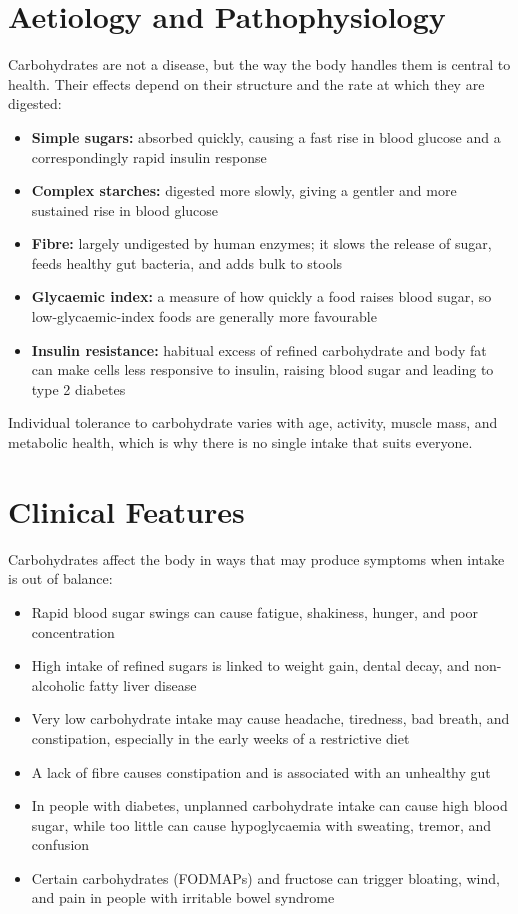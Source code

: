 \section*{Aetiology and Pathophysiology}
Carbohydrates are not a disease, but the way the body handles them is central to health. Their effects depend on their structure and the rate at which they are digested:
\begin{itemize}
    \item \textbf{Simple sugars:} absorbed quickly, causing a fast rise in blood glucose and a correspondingly rapid insulin response
    \item \textbf{Complex starches:} digested more slowly, giving a gentler and more sustained rise in blood glucose
    \item \textbf{Fibre:} largely undigested by human enzymes; it slows the release of sugar, feeds healthy gut bacteria, and adds bulk to stools
    \item \textbf{Glycaemic index:} a measure of how quickly a food raises blood sugar, so low-glycaemic-index foods are generally more favourable
    \item \textbf{Insulin resistance:} habitual excess of refined carbohydrate and body fat can make cells less responsive to insulin, raising blood sugar and leading to type 2 diabetes
\end{itemize}
Individual tolerance to carbohydrate varies with age, activity, muscle mass, and metabolic health, which is why there is no single intake that suits everyone.

\section*{Clinical Features}
Carbohydrates affect the body in ways that may produce symptoms when intake is out of balance:
\begin{itemize}
    \item Rapid blood sugar swings can cause fatigue, shakiness, hunger, and poor concentration
    \item High intake of refined sugars is linked to weight gain, dental decay, and non-alcoholic fatty liver disease
    \item Very low carbohydrate intake may cause headache, tiredness, bad breath, and constipation, especially in the early weeks of a restrictive diet
    \item A lack of fibre causes constipation and is associated with an unhealthy gut
    \item In people with diabetes, unplanned carbohydrate intake can cause high blood sugar, while too little can cause hypoglycaemia with sweating, tremor, and confusion
    \item Certain carbohydrates (FODMAPs) and fructose can trigger bloating, wind, and pain in people with irritable bowel syndrome
\end{itemize}

